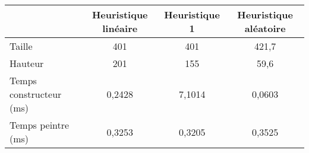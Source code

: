 \begin{center}
{\tabulinesep=1.2mm
\begin{tabu}{|l|c|c|c|}
  \hline
  & Heuristique linéaire  & Heuristique 1 & Heuristique aléatoire \\ 
  \hline
  Taille &       401&       401&     421,7  \\ 
  \hline
  Hauteur &       201&       155&      59,6  \\ 
  \hline
  Temps constructeur (ms) &          0,2428&          7,1014&          0,0603  \\ 
  \hline
  Temps peintre (ms) &            0,3253&           0,3205&           0,3525  \\ 
  \hline
\end{tabu}
}
\end{center}

